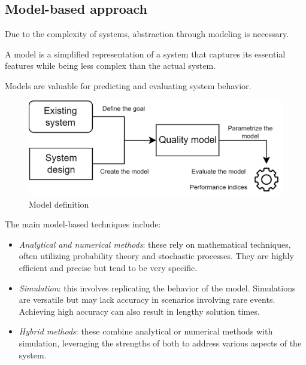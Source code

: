 \subsection{Model-based approach}
Due to the complexity of systems, abstraction through modeling is necessary.

\begin{definition}
    A model is a simplified representation of a system that captures its essential features while being less complex than the actual system.
\end{definition}
Models are valuable for predicting and evaluating system behavior.
\begin{figure}[H]
    \centering
    \includegraphics[width=0.5\linewidth]{images/model.png}
    \caption{Model definition}
\end{figure}

The main model-based techniques include:
\begin{itemize}
    \item \textit{Analytical and numerical methods}: these rely on mathematical techniques, often utilizing probability theory and stochastic processes.
        They are highly efficient and precise but tend to be very specific.
    \item \textit{Simulation}: this involves replicating the behavior of the model.
        Simulations are versatile but may lack accuracy in scenarios involving rare events.
        Achieving high accuracy can also result in lengthy solution times.
    \item \textit{Hybrid methods}: these combine analytical or numerical methods with simulation, leveraging the strengths of both to address various aspects of the system.
\end{itemize}